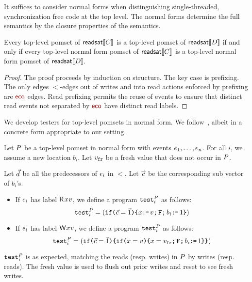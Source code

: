 It suffices to consider normal forms when distinguishing single-threaded, synchronization free code at the top level.  The normal forms determine the full semantics by the closure properties of the semantics.

\begin{lemma}\label{unrhd}
Every top-level pomset of $\mathsf{readsat}\llbracket C\rrbracket$ is a top-level pomset of $\mathsf{readsat}\llbracket D\rrbracket$ if and only if 
every top-level normal form pomset of $\mathsf{readsat}\llbracket C\rrbracket$ is a top-level normal form pomset of $\mathsf{readsat}\llbracket D\rrbracket$.
\begin{proof}
The proof proceeds by induction on structure.  The key case is prefixing.  The only edges $\lt$-edges out of writes  and into read actions enforced by prefixing are $\reco$ edges.  Read prefixing permits the reuse of events to ensure that distinct read events not separated by $\reco$ have distinct read labels.  
\end{proof}
\end{lemma}

We develop testers for top-level pomsets in normal form.  We  follow~\citet{Plotkin:1997:TSP:266557.266600}, albeit in a concrete form appropriate to our setting.   

Let $P$ be a top-level pomset in normal form with events $e_1, \ldots,
e_n$.  For all $i$, we assume a new location $b_i$.    Let $v_{{\tt fr}}$ be a fresh value that does not occur in $P$.  

Let $\vec{d}$ be all  the predecessors of $e_i$ in $\lt$. Let $\vec{c}$ be the corresponding sub vector of $b_i$'s. 
\begin{itemize}
\item 
If $e_i$ has label $\DR{\aLoc}{\aVal}$, we define a program ${\tt test}^{P}_{i}$ as follows:  
\[
  {\tt test}^{P}_{i} = (
  \texttt{if}\allowbreak\texttt{(}\vec{c}=\vec{1}\texttt{)} \allowbreak\texttt{\{} x \texttt{:}\mkern-1mu\texttt{=}\, v \texttt{;}\,\allowbreak  \texttt{F} \texttt{;}\,\allowbreak b_i \texttt{:}\mkern-1mu\texttt{=}\, 1 \texttt{\}})
\]
\item 
If $e_i$ has label $\DW{\aLoc}{\aVal}$, we define a program ${\tt test}^{P}_{i}$ as follows:
\[
  \testP{\aPS}{i} = (
  \IF{\vec{c}=\vec{1}} \THEN %
  \IF{\aLoc = \aVal} \THEN \aLoc = \freshaval \SEMI \FENCE \SEMI b_i \GETS 1  \FI \FI)
\]
\end{itemize}
${\tt test}^{P}_{i}$ is as expected, matching the reads (resp. writes) in $P$ by writes (resp. reads).  The fresh value is used to flush out prior writes and reset to see fresh writes.    


